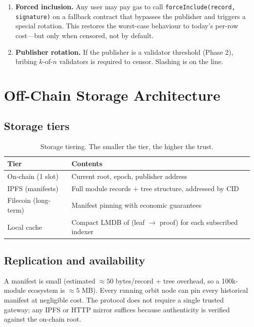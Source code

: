 \documentclass[11pt,a4paper]{article}
\begin{document}
\begin{enumerate}
    \item \textbf{Forced inclusion.} Any user may pay gas to call \texttt{forceInclude(record, signature)} on a fallback contract that bypasses the publisher and triggers a special rotation. This restores the worst-case behaviour to today's per-row cost---but only when censored, not by default.
    \item \textbf{Publisher rotation.} If the publisher is a validator threshold (Phase 2), bribing $k$-of-$n$ validators is required to censor. Slashing is on the line.
\end{enumerate}

\section{Off-Chain Storage Architecture}

\subsection{Storage tiers}

\begin{table}[H]
\centering
\begin{tabularx}{\textwidth}{lX}
\toprule
\textbf{Tier} & \textbf{Contents} \\
\midrule
On-chain (1 slot) & Current root, epoch, publisher address \\
IPFS (manifests) & Full module records + tree structure, addressed by CID \\
Filecoin (long-term) & Manifest pinning with economic guarantees \\
Local cache & Compact LMDB of (leaf $\to$ proof) for each subscribed indexer \\
\bottomrule
\end{tabularx}
\caption{Storage tiering. The smaller the tier, the higher the trust.}
\end{table}

\subsection{Replication and availability}

A manifest is small (estimated $\approx 50$ bytes/record + tree overhead, so a 100k-module ecosystem is $\approx 5$ MB). Every running orbit node can pin every historical manifest at negligible cost. The protocol does not require a single trusted gateway; any IPFS or HTTP mirror suffices because authenticity is verified against the on-chain root.
\end{document}
